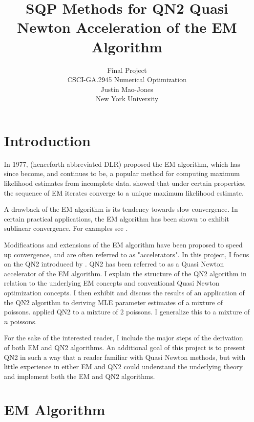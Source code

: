 \documentclass[letter,12pt]{article}
\begin{document}
\title{SQP Methods for QN2 Quasi Newton Acceleration of the EM Algorithm}
\author{Final Project\\CSCI-GA.2945 Numerical Optimization\\Justin Mao-Jones\\New York University}
\renewcommand{\today}{December 14, 2014}
\maketitle

\section{Introduction}

In 1977, \citeauthor*{dempsterlr77} (henceforth abbreviated DLR) proposed the EM algorithm, which has since become, and continues to be, a popular method for computing maximum likelihood estimates from incomplete data.  \cite{wu1983} showed that under certain properties, the sequence of EM iterates converge to a unique maximum likelihood estimate.

A drawback of the EM algorithm is its tendency towards slow convergence.  In certain practical applications, the EM algorithm has been shown to exhibit sublinear convergence.  For examples see \cite{lange1995a,jamshidianj93,jamshidianj97}.

Modifications and extensions of the EM algorithm have been proposed to speed up convergence, and are often referred to as "accelerators".  In this project, I focus on the QN2 introduced by \cite{jamshidianj97}.  QN2 has been referred to as a Quasi Newton accelerator of the EM algorithm.  I explain the structure of the QN2 algorithm in relation to the underlying EM concepts and conventional Quasi Newton optimization concepts.  I then exhibit and discuss the results of an application of the QN2 algorithm to deriving MLE parameter estimates of a mixture of poissons.  \cite{jamshidianj97} applied QN2 to a mixture of 2 poissons.  I generalize this to a mixture of $n$ poissons.

For the sake of the interested reader, I include the major steps of the derivation of both EM and QN2 algorithms.  An additional goal of this project is to present QN2 in such a way that a reader familiar with Quasi Newton methods, but with little experience in either EM and QN2 could understand the underlying theory and implement both the EM and QN2 algorithms.

\section{EM Algorithm}
\end{document}
